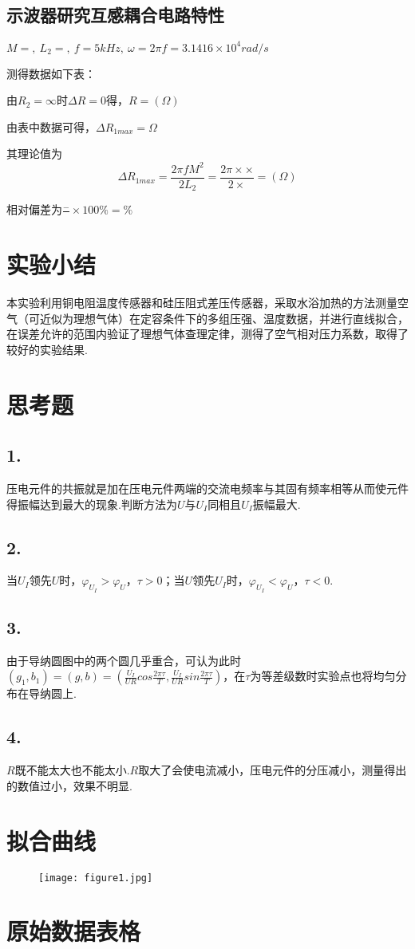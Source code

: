 \documentclass{thureport}
\begin{document}
\subsection{示波器研究互感耦合电路特性}
$M=,\ L_2=,\ f=5kHz,\ \omega=2\pi f=3.1416\times10^4rad/s$

测得数据如下表：

由$R_2=\infty$时$\Delta R=0$得，$R=(\Omega)$

由表中数据可得，$\Delta R_{1max}=\Omega$

其理论值为$$\Delta R_{1max}=\frac{2\pi fM^2}{2L_2}=\frac{2\pi\times\times}{2\times}=(\Omega)$$

相对偏差为$\frac{-}{}\times100\%=\%$
\section{实验小结}
本实验利用铜电阻温度传感器和硅压阻式差压传感器，采取水浴加热的方法测量空气（可近似为理想气体）在定容条件下的多组压强、温度数据，并进行直线拟合，在误差允许的范围内验证了理想气体查理定律，测得了空气相对压力系数，取得了较好的实验结果.

\section{思考题}
\subsection*{1.}
压电元件的共振就是加在压电元件两端的交流电频率与其固有频率相等从而使元件得振幅达到最大的现象.判断方法为$U$与$U_I$同相且$U_I$振幅最大.

\subsection*{2.}
当$U_I$领先$U$时，$\varphi_{U_I}>\varphi_{U}$，$\tau>0$；当$U$领先$U_I$时，$\varphi_{U_I}<\varphi_{U}$，$\tau<0$.

\subsection*{3.}
由于导纳圆图中的两个圆几乎重合，可认为此时$(g_1,b_1)=(g,b)=(\frac{U_I}{UR}cos\frac{2\pi\tau}{T},\frac{U_I}{UR}sin\frac{2\pi\tau}{T})$，在$\tau$为等差级数时实验点也将均匀分布在导纳圆上.

\subsection*{4.}
$R$既不能太大也不能太小.$R$取大了会使电流减小，压电元件的分压减小，测量得出的数值过小，效果不明显.

\clearpage
\section{拟合曲线}
\begin{figure}[h]
	\centering
	\texttt{[image: figure1.jpg]}
\end{figure}

\clearpage
\section{原始数据表格}
\clearpage
\end{document}
